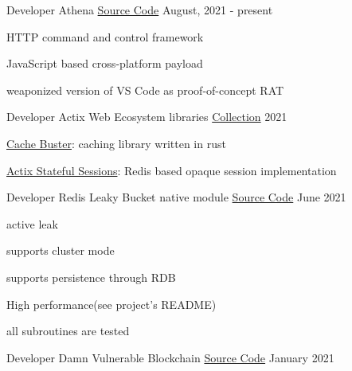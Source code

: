 
\begin{cventries}
  \cventry
    {Developer} %
    {Athena} %
    {\href{https://github.com/realaravinth/athena}{Source Code}} %
    {August, 2021 - present} %
    {
      \begin{cvitems} %
        \item {HTTP command and control framework}
        \item {JavaScript based cross-platform payload}
        \item {weaponized version of VS Code as proof-of-concept RAT}
      \end{cvitems}
    }
  
    \cventry
    {Developer} %
    {Actix Web Ecosystem libraries} %
    {\href{https://github.com/realaravinth?tab=repositories&q=actix&type=&language=&sort=}{Collection}} %
    {2021} %
    {
     \begin{cvitems} %
      \item {{\href{https://github.com/realaravinth/cache-buster}{Cache Buster}}: caching library written in rust}
        \item {{\href{https://github.com/realaravinth/actix-stateful-sessions}{Actix Stateful Sessions}}: Redis based opaque session implementation}
      \end{cvitems}
    }
  \cventry
    {Developer} %
    {Redis Leaky Bucket native module} %
    {\href{https://github.com/realaravinth/redis-leaky-bucket}{Source Code}} %
    {June 2021} %
    {
      \begin{cvitems} %
      \item {active leak}
        \item {supports cluster mode}
        \item {supports persistence through RDB}
        \item {High performance(see project's README)}
    	\item {all subroutines are tested}
      \end{cvitems}
    }
  \cventry
    {Developer} %
    {Damn Vulnerable Blockchain} %
    {\href{https://github.com/realaravinth/damn-vuln-blockchain}{Source Code}} %
    {January 2021} %
    {
      \begin{cvitems} %

\end{cvitems}}
\end{cventries}
